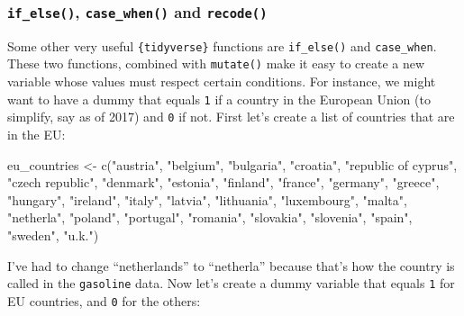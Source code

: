 \documentclass[
]{article}
\newenvironment{Shaded}{\begin{snugshade}}{\end{snugshade}}
\newcommand{\FunctionTok}[1]{\textcolor[rgb]{0.00,0.00,0.00}{#1}}
\newcommand{\NormalTok}[1]{#1}
\newcommand{\OtherTok}[1]{\textcolor[rgb]{0.56,0.35,0.01}{#1}}
\newcommand{\StringTok}[1]{\textcolor[rgb]{0.31,0.60,0.02}{#1}}
\begin{document}
\hypertarget{if_else-case_when-and-recode}{%
\subsubsection{\texorpdfstring{\texttt{if\_else()}, \texttt{case\_when()} and \texttt{recode()}}{if\_else(), case\_when() and recode()}}\label{if_else-case_when-and-recode}}

Some other very useful \texttt{\{tidyverse\}} functions are \texttt{if\_else()} and \texttt{case\_when}. These two
functions, combined with \texttt{mutate()} make it easy to create a new variable whose values must
respect certain conditions. For instance, we might want to have a dummy that equals \texttt{1} if a country
in the European Union (to simplify, say as of 2017) and \texttt{0} if not. First let's create a list of
countries that are in the EU:

\begin{Shaded}
\begin{Highlighting}[]
\NormalTok{eu\_countries }\OtherTok{\textless{}{-}} \FunctionTok{c}\NormalTok{(}\StringTok{"austria"}\NormalTok{, }\StringTok{"belgium"}\NormalTok{, }\StringTok{"bulgaria"}\NormalTok{, }\StringTok{"croatia"}\NormalTok{, }\StringTok{"republic of cyprus"}\NormalTok{,}
                  \StringTok{"czech republic"}\NormalTok{, }\StringTok{"denmark"}\NormalTok{, }\StringTok{"estonia"}\NormalTok{, }\StringTok{"finland"}\NormalTok{, }\StringTok{"france"}\NormalTok{, }\StringTok{"germany"}\NormalTok{,}
                  \StringTok{"greece"}\NormalTok{, }\StringTok{"hungary"}\NormalTok{, }\StringTok{"ireland"}\NormalTok{, }\StringTok{"italy"}\NormalTok{, }\StringTok{"latvia"}\NormalTok{, }\StringTok{"lithuania"}\NormalTok{, }\StringTok{"luxembourg"}\NormalTok{,}
                  \StringTok{"malta"}\NormalTok{, }\StringTok{"netherla"}\NormalTok{, }\StringTok{"poland"}\NormalTok{, }\StringTok{"portugal"}\NormalTok{, }\StringTok{"romania"}\NormalTok{, }\StringTok{"slovakia"}\NormalTok{, }\StringTok{"slovenia"}\NormalTok{,}
                  \StringTok{"spain"}\NormalTok{, }\StringTok{"sweden"}\NormalTok{, }\StringTok{"u.k."}\NormalTok{)}
\end{Highlighting}
\end{Shaded}

I've had to change ``netherlands'' to ``netherla'' because that's how the country is called in the
\texttt{gasoline} data. Now let's create a dummy variable that equals \texttt{1} for EU countries, and \texttt{0} for the others:
\end{document}
